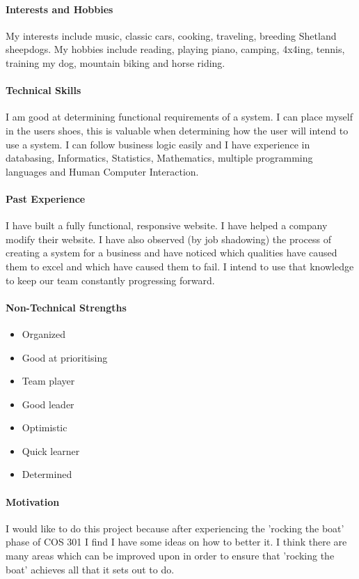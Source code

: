 \documentclass[english]{article}
\begin{document}
			\paragraph{Interests and Hobbies}
			My interests include music, classic cars, cooking, traveling, breeding Shetland sheepdogs. My hobbies include reading, playing piano, camping, 4x4ing, tennis, training my dog, mountain biking and horse riding.
			
			\paragraph{Technical Skills}
			I am good at determining functional requirements of a system. I can place myself in the users shoes, this is valuable when determining how the user will intend to use a system. I can follow business logic easily and I have experience in databasing, Informatics, Statistics, Mathematics, multiple programming languages and Human Computer Interaction.
			
			\paragraph{Past Experience}
			I have built a fully functional, responsive website. I have helped a company modify their website. I have also observed (by job shadowing) the process of creating a system for a business and have noticed which qualities have caused them to excel and which have caused them to fail. I intend to use that knowledge to keep our team constantly progressing forward.
			
			\paragraph{Non-Technical Strengths}
			\begin{itemize}
				\setlength\itemsep{0.2em}
			        \item Organized
			        \item Good at prioritising 
			        \item Team player
			        \item Good leader
			        \item Optimistic
			        \item Quick learner
			        \item Determined
			\end{itemize}
			
			\paragraph{Motivation}
			I would like to do this project because after experiencing the 'rocking the boat' phase of COS 301 I find I have some ideas on how to better it. I think there are many areas which can be improved upon in order to ensure that 'rocking the boat' achieves all that it sets out to do.
		
\end{document}
